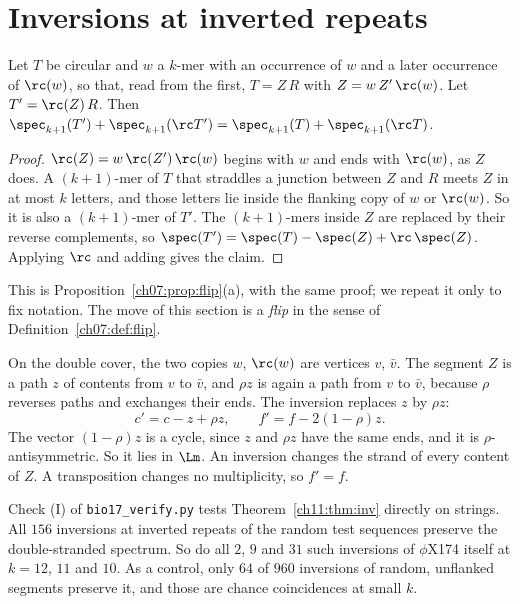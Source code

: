\section{Inversions at inverted repeats}\label{ch11:sec:inv}

\begin{theorem}\label{ch11:thm:inv}
Let $T$ be circular and $w$ a $k$-mer with an occurrence of $w$ and a later occurrence of $\rc(w)$, so
that, read from the first, $T=Z\,R$ with $Z=w\,Z'\,\rc(w)$. Let $T'=\rc(Z)\,R$. Then
$\spec_{k+1}(T')+\spec_{k+1}(\rc T')=\spec_{k+1}(T)+\spec_{k+1}(\rc T)$.
\end{theorem}

\begin{proof}
$\rc(Z)=w\,\rc(Z')\,\rc(w)$ begins with $w$ and ends with $\rc(w)$, as $Z$ does. A $(k+1)$-mer of $T$ that
straddles a junction between $Z$ and $R$ meets $Z$ in at most $k$ letters, and those letters lie inside
the flanking copy of $w$ or $\rc(w)$. So it is also a $(k+1)$-mer of $T'$. The $(k+1)$-mers inside $Z$ are
replaced by their reverse complements, so
$\spec(T')=\spec(T)-\spec(Z)+\rc\,\spec(Z)$. Applying $\rc$ and adding gives the claim.
\end{proof}

This is Proposition~\ref{ch07:prop:flip}(a), with the same proof; we repeat it only to fix
notation. The move of this section is a \emph{flip} in the sense of Definition~\ref{ch07:def:flip}.

On the double cover, the two copies $w$, $\rc(w)$ are vertices $v$, $\bar v$. The segment $Z$ is a path
$z$ of contents from $v$ to $\bar v$, and $\rho z$ is again a path from $v$ to $\bar v$, because $\rho$
reverses paths and exchanges their ends. The inversion replaces $z$ by $\rho z$:
\begin{equation}\label{ch11:eq:move}
c'=c-z+\rho z,\qquad f'=f-2(1-\rho)z .
\end{equation}
The vector $(1-\rho)z$ is a cycle, since $z$ and $\rho z$ have the same ends, and it is $\rho$-antisymmetric.
So it lies in $\Lm$. An inversion changes the strand of every content of $Z$. A transposition changes no
multiplicity, so $f'=f$.

Check (I) of \texttt{bio17\_verify.py} tests Theorem~\ref{ch11:thm:inv} directly on strings. All $156$
inversions at inverted repeats of the random test sequences preserve the double-stranded spectrum. So
do all $2$, $9$ and $31$ such inversions of $\phi$X174 itself at $k=12$, $11$ and $10$. As a control,
only $64$ of $960$ inversions of random, unflanked segments preserve it, and those are chance
coincidences at small $k$.

